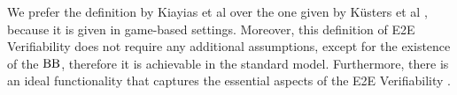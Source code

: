  We prefer the definition by Kiayias et al over the one given by K\"{u}sters et al \cite{Kusters2010}, because it is given in game-based settings. Moreover, this definition of E2E Verifiability does not require any additional assumptions, except for the existence of the $\operatorname{BB}$, therefore it is achievable in the standard model. Furthermore, there is an ideal functionality that captures the essential aspects of the E2E Verifiability \cite{idfunc}.  
 



